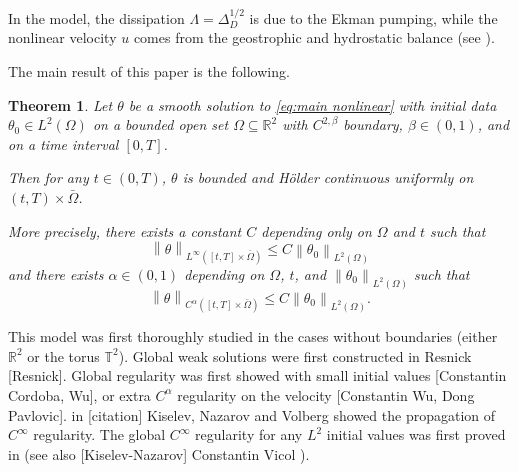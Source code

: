 \documentclass[11pt]{amsart}
\newtheorem{theorem}{Theorem}[section]
\theoremstyle{remark}
\theoremstyle{definition}
\newcommand{\R}{\mathbb{R}}
\newcommand{\T}{\mathbb{T}}
\newcommand{\norm}[1]{\left\lVert#1\right\rVert}
\begin{document}
In the model, the dissipation $\Lambda =\Delta_D^{1/2}$  is due to the  Ekman pumping, while the nonlinear velocity $u$ comes from the geostrophic and hydrostatic balance (see \cite{Pe}).

The main result of this paper is the following.
\begin{theorem} \label{thm:main continuity}
Let $\theta$ be a smooth solution to \eqref{eq:main nonlinear} with initial data $\theta_0 \in L^2(\Omega)$ on a bounded open set $\Omega \subseteq \R^2$ with $C^{2,\beta}$ boundary, $\beta \in (0,1)$, and on a time interval $[0,T]$.  

Then for any $t \in (0,T)$, $\theta$ is bounded and H\"{o}lder continuous uniformly on $(t,T)\times\bar{\Omega}$.  
\vskip0.3cm

More precisely, there exists a constant $C$ depending only on $\Omega$ and $t$ such that
\[ \norm{\theta}_{L^\infty([t,T]\times\bar{\Omega})} \leq C \norm{\theta_0}_{L^2(\Omega)} \]
and there exists $\alpha \in (0,1)$ depending on $\Omega$, $t$, and $\norm{\theta_0}_{L^2(\Omega)}$ such that
\[ \norm{\theta}_{C^\alpha([t,T]\times\bar{\Omega})} \leq C \norm{\theta_0}_{L^2(\Omega)}. \]

\end{theorem}

This model was first thoroughly studied in the cases without boundaries (either $\R^2$ or the torus $\T^2$).   
Global weak solutions were first constructed in Resnick [Resnick]. Global regularity was first showed with small initial values [Constantin Cordoba, Wu], or extra $C^\alpha$ regularity on the velocity [Constantin Wu, Dong Pavlovic]. in [citation] Kiselev, Nazarov and Volberg showed the 
propagation of $C^\infty$ regularity. The global $C^\infty$ regularity for any $L^2$ initial values was first proved in  \cite{CaVa.sqg} (see also [Kiselev-Nazarov] Constantin Vicol \cite{CoVi}).   

\vskip0.3cm
\end{document}
